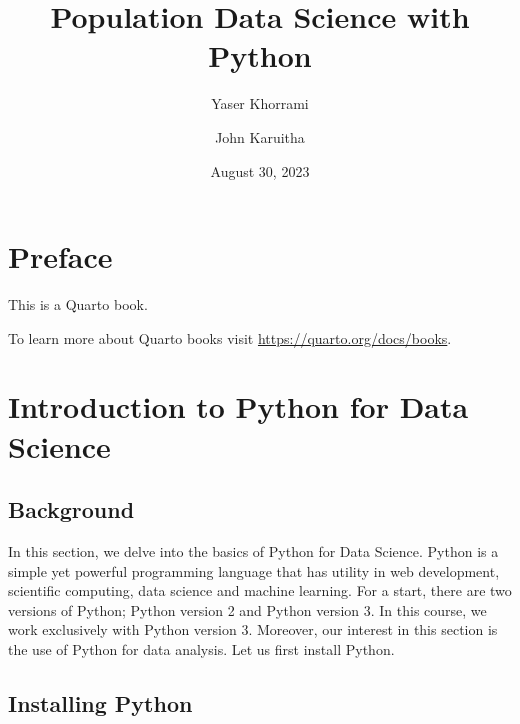 \documentclass[
  letterpaper,
  DIV=11,
  numbers=noendperiod]{scrreprt}
\title{\textbf{Population Data Science with Python}}
\author{Yaser Khorrami \and John Karuitha}
\date{August 30, 2023}
\renewcommand*\contentsname{Table of contents}
\newcommand\contentsname{Table of contents}
\begin{document}
\maketitle
\ifdefined\Shaded\renewenvironment{Shaded}{\begin{tcolorbox}[breakable, frame hidden, sharp corners, enhanced, boxrule=0pt, borderline west={3pt}{0pt}{shadecolor}, interior hidden]}{\end{tcolorbox}}\fi

\renewcommand*\contentsname{Table of contents}
{
\hypersetup{linkcolor=}
\setcounter{tocdepth}{2}
\tableofcontents
}

\hypertarget{preface}{%
\chapter*{Preface}\label{preface}}


This is a Quarto book.

To learn more about Quarto books visit
\url{https://quarto.org/docs/books}.


\hypertarget{introduction-to-python-for-data-science}{%
\chapter{\texorpdfstring{\textbf{Introduction to Python for Data
Science}}{Introduction to Python for Data Science}}\label{introduction-to-python-for-data-science}}

\hypertarget{background}{%
\section{Background}\label{background}}

In this section, we delve into the basics of Python for Data Science.
Python is a simple yet powerful programming language that has utility in
web development, scientific computing, data science and machine
learning. For a start, there are two versions of Python; Python version
2 and Python version 3. In this course, we work exclusively with Python
version 3. Moreover, our interest in this section is the use of Python
for data analysis. Let us first install Python.

\hypertarget{installing-python}{%
\section{Installing Python}\label{installing-python}}
\end{document}
